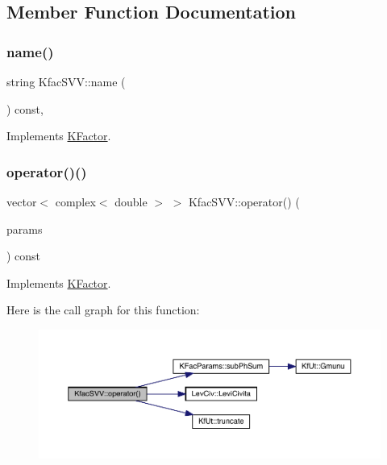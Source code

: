 \subsection{Member Function Documentation}
\mbox{\label{classKfacSVV_ad7ab40ec924a678cd785a9743e676d6c}} 
\subsubsection{\texorpdfstring{name()}{name()}}
{\footnotesize\ttfamily string Kfac\+S\+V\+V\+::name (\begin{DoxyParamCaption}{ }\end{DoxyParamCaption}) const\hspace{0.3cm}{\ttfamily [inline]}, {\ttfamily [virtual]}}



Implements \mbox{\hyperlink{classKFactor_ae578f8d6e4b525895427717da99cab6c}{K\+Factor}}.

\mbox{\label{classKfacSVV_acb7f7f6bf0957694a73271704bb0569f}} 
\subsubsection{\texorpdfstring{operator()()}{operator()()}}
{\footnotesize\ttfamily vector$<$ complex$<$ double $>$ $>$ Kfac\+S\+V\+V\+::operator() (\begin{DoxyParamCaption}\item[{const \mbox{\hyperlink{classKFacParams}{K\+Fac\+Params}} \&}]{params }\end{DoxyParamCaption}) const\hspace{0.3cm}{\ttfamily [virtual]}}



Implements \mbox{\hyperlink{classKFactor_a012aae9ff4a07eab86d5d50b7f774285}{K\+Factor}}.

Here is the call graph for this function\+:\nopagebreak
\begin{figure}[H]
\begin{center}
\leavevmode
\includegraphics[width=350pt]{d3/d61/classKfacSVV_acb7f7f6bf0957694a73271704bb0569f_cgraph}
\end{center}
\end{figure}


